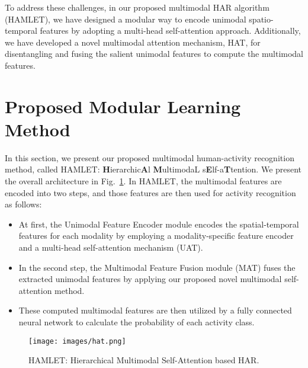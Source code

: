 \documentclass[runningheads]{llncs}
\newcommand{\pa}{HAMLET}
\newcommand{\hattn}{HAT}
\newcommand{\fpa}{HAMLET: \textbf{H}ierarchic\textbf{A}l \textbf{M}ultimodaL s\textbf{E}lf-a\textbf{T}tention}
\begin{document}
To address these challenges, in our  proposed multimodal HAR algorithm (\pa),
we have designed a modular way to encode unimodal spatio-temporal features by adopting a multi-head self-attention approach. Additionally, we have developed a novel multimodal attention mechanism, {\hattn}, for disentangling and fusing the salient unimodal features to compute the multimodal features. 












%
 \section{Proposed Modular Learning Method}
\label{sec:proposedApproach}

In this section, we present our proposed multimodal human-activity recognition method, called \fpa. We present the overall architecture in Fig.~\ref{fig:hat}. In {\pa }, the multimodal features are encoded into two steps, and those features are then used for activity recognition as follows:
\begin{itemize}
    \item At first, the Unimodal Feature Encoder module encodes the spatial-temporal features for each modality by employing a modality-specific feature encoder and a multi-head self-attention mechanism (UAT).
    \item In the second step, the Multimodal Feature Fusion module (MAT) fuses the extracted unimodal features by applying our proposed novel multimodal self-attention method.
    \item These computed multimodal features are then utilized by a fully connected neural network to calculate the probability of each activity class.
\end{itemize}



\begin{figure}[!t]
    \centering
    \texttt{[image: images/hat.png]}
    \caption{{\pa }: Hierarchical Multimodal Self-Attention based HAR.}
    \label{fig:hat}
    \vspace{-0.2in}
\end{figure}
\end{document}
